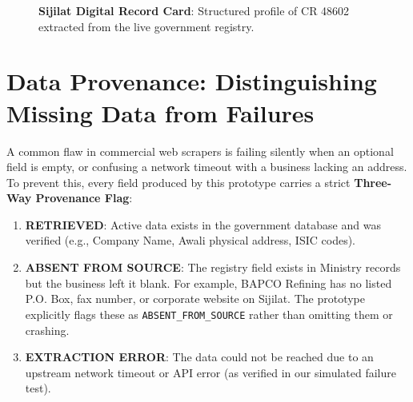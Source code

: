 \documentclass[11pt,a4paper]{article}
\begin{document}
\begin{figure}[H]
\caption{\textbf{Sijilat Digital Record Card}: Structured profile of CR 48602 extracted from the live government registry.}
\label{fig:registry_card}
\end{figure}

\section{\color{primary}Data Provenance: Distinguishing Missing Data from Failures}

A common flaw in commercial web scrapers is failing silently when an optional field is empty, or confusing a network timeout with a business lacking an address. To prevent this, every field produced by this prototype carries a strict \textbf{Three-Way Provenance Flag}:

\begin{enumerate}[leftmargin=1.5em, itemsep=2pt]
    \item \textbf{\color{secondary}RETRIEVED}: Active data exists in the government database and was verified (e.g., Company Name, Awali physical address, ISIC codes).
    \item \textbf{\color{primary}ABSENT FROM SOURCE}: The registry field exists in Ministry records but the business left it blank. For example, BAPCO Refining has no listed P.O. Box, fax number, or corporate website on Sijilat. The prototype explicitly flags these as \texttt{ABSENT\_FROM\_SOURCE} rather than omitting them or crashing.
    \item \textbf{\color{accent}EXTRACTION ERROR}: The data could not be reached due to an upstream network timeout or API error (as verified in our simulated failure test).
\end{enumerate}
\end{document}
